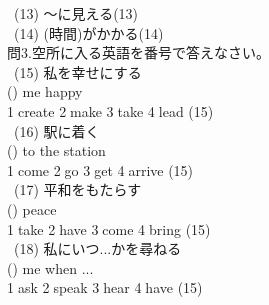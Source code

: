 \documentclass[uplatex]{jsarticle}
\begin{document}
\ (13) 〜に見える\hspace{\fill}(13)\underline{\hspace{35mm}}\\
\ (14) (時間)がかかる\hspace{\fill}(14)\underline{\hspace{35mm}}\\
\Large 問3.空所に入る英語を番号で答えなさい。\\
\large\ (15) 私を幸せにする\\
\hspace{10mm}(\hspace{10mm}) me happy\\
\hspace{10mm}\textcircled{\normalsize1}create \textcircled{\normalsize2}make \textcircled{\normalsize3}take \textcircled{\normalsize4}lead 
\hspace{\fill}(15)\underline{\hspace{35mm}}\\
\ (16) 駅に着く\\
\hspace{10mm}(\hspace{10mm}) to the station\\
\hspace{10mm}\textcircled{\normalsize1}come \textcircled{\normalsize2}go \textcircled{\normalsize3}get \textcircled{\normalsize4}arrive 
\hspace{\fill}(15)\underline{\hspace{35mm}}\\
\ (17) 平和をもたらす\\
\hspace{10mm}(\hspace{10mm}) peace\\
\hspace{10mm}\textcircled{\normalsize1}take \textcircled{\normalsize2}have \textcircled{\normalsize3}come \textcircled{\normalsize4}bring 
\hspace{\fill}(15)\underline{\hspace{35mm}}\\
\ (18) 私にいつ...かを尋ねる\\
\hspace{10mm}(\hspace{10mm}) me when ...\\
\hspace{10mm}\textcircled{\normalsize1}ask \textcircled{\normalsize2}speak \textcircled{\normalsize3}hear \textcircled{\normalsize4}have 
\hspace{\fill}(15)\underline{\hspace{35mm}}\\
\end{document}
